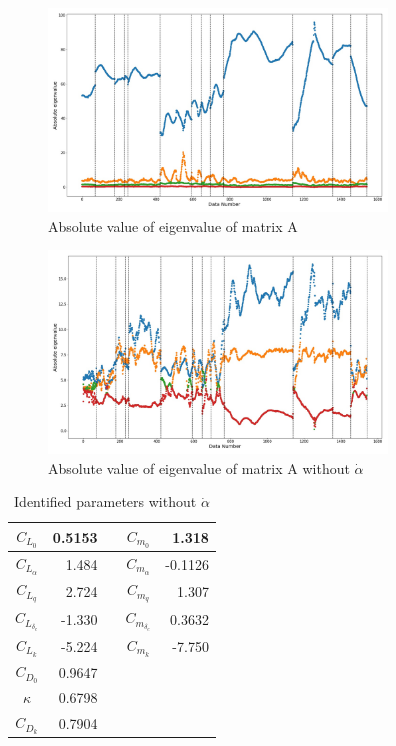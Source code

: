 \begin{figure}[H]
	\centering
	\includegraphics[clip,width=9.0cm,bb=0 0 1440 864]{./z_figure_files/chapter5/eigen_bad.jpeg}
	\caption{Absolute value of eigenvalue of matrix A}
	\label{fig:eigen}
\end{figure}

\begin{figure}[H]
	\centering
	\includegraphics[clip,width=9.0cm,bb=0 0 1440 864]{./z_figure_files/chapter5/eigen_good.jpeg}
	\caption{Absolute value of eigenvalue of matrix A without $\dot{\alpha}$}
	\label{fig:eigen_nondalpha}
\end{figure}

\begin{table} [htbp]
  \begin{center}
    \caption{Identified parameters without $\dot{\alpha}$}
    \label{tb:si_result_nondalpha}
    \begin{tabular}{|c||r|cc||r|} \hline
      $C_{L_0}$ & 0.5153 & & $C_{m_0}$ & 1.318 \\ \hline
      $C_{L_\alpha}$ & 1.484 & & $C_{m_\alpha}$ & -0.1126 \\ \hline
      $C_{L_q}$ & 2.724 & & $C_{m_q}$ & 1.307\\ \hline
      $C_{L_{\delta_e}}$ & -1.330 & & $C_{m_{\delta_e}}$ & 0.3632 \\ \hline
      $C_{L_k}$ & -5.224 & & $C_{m_k}$ & -7.750 \\ \hline
      $C_{D_0}$ & 0.9647 &&&\\ \hline
      $\kappa$ & 0.6798 &&&\\ \hline
      $C_{D_k}$ & 0.7904 &&&\\ \hline
    \end{tabular}
  \end{center}
\end{table}

